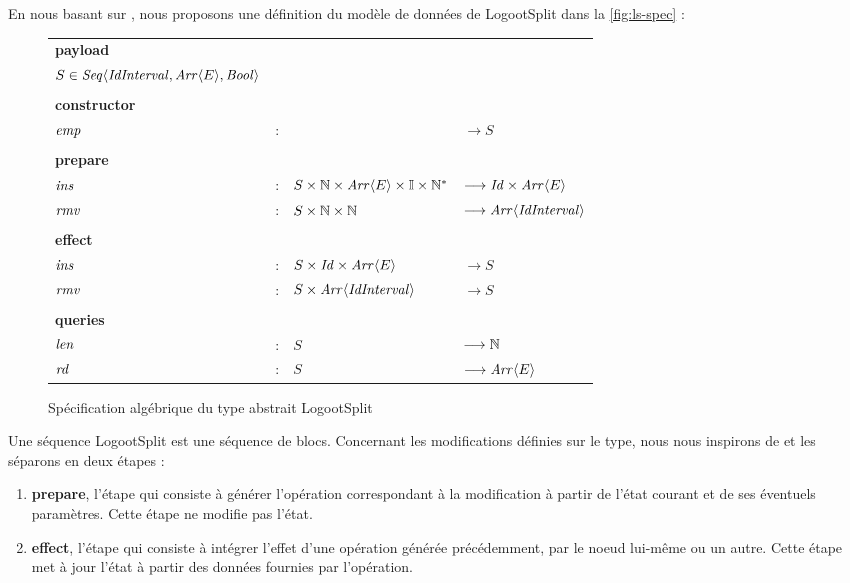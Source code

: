 En nous basant sur \textcite{2013-logootsplit}, nous proposons une définition du modèle de données de LogootSplit dans la \autoref{fig:ls-spec} :

\begin{figure}[!ht]
  \centering
    \begin{tabular}{llll}
      \textbf{payload} \\
      $S \in \mathit{Seq}\langle \mathit{IdInterval},\mathit{Arr}\langle E \rangle, \mathit{Bool} \rangle$ \\
      \\
      \textbf{constructor} \\
      $\mathit{emp}$ & : &                                                 & $\longrightarrow S$   \\
      \\
      \textbf{prepare} \\
      $\mathit{ins}$ & : & $S \times \mathbb{N} \times \mathit{Arr}\langle E \rangle \times \mathbb{I} \times \mathbb{N}^*$   & $\longrightarrow \mathit{Id} \times \mathit{Arr}\langle E \rangle$   \\
      $\mathit{rmv}$ & : & $S \times \mathbb{N} \times \mathbb{N}$                           & $\longrightarrow \mathit{Arr}\langle \mathit{IdInterval} \rangle$ \\
      \\
      \textbf{effect} \\
      $\mathit{ins}$ & : & $S \times \mathit{Id} \times \mathit{Arr}\langle E \rangle$ & $\longrightarrow S$ \\
      $\mathit{rmv}$ & : & $S \times \mathit{Arr}\langle \mathit{IdInterval} \rangle$  & $\longrightarrow S$ \\
      \\
      \textbf{queries} \\
      $\mathit{len}$ & : & $S$                                             & $\longrightarrow \mathbb{N}$   \\
      $\mathit{rd}$  & : & $S$                                             & $\longrightarrow \mathit{Arr}\langle E \rangle$ \\
    \end{tabular}
  \caption{Spécification algébrique du type abstrait LogootSplit}
  \label{fig:ls-spec}
\end{figure}

Une séquence LogootSplit est une séquence de blocs.
Concernant les modifications définies sur le type, nous nous inspirons de \cite{baquero2017pure} et les séparons en deux étapes :
\begin{enumerate}
  \item \textbf{prepare}, l'étape qui consiste à générer l'opération correspondant à la modification à partir de l'état courant et de ses éventuels paramètres.
    Cette étape ne modifie pas l'état.
  \item \textbf{effect}, l'étape qui consiste à intégrer l'effet d'une opération générée précédemment, par le noeud lui-même ou un autre.
    Cette étape met à jour l'état à partir des données fournies par l'opération.
\end{enumerate}

